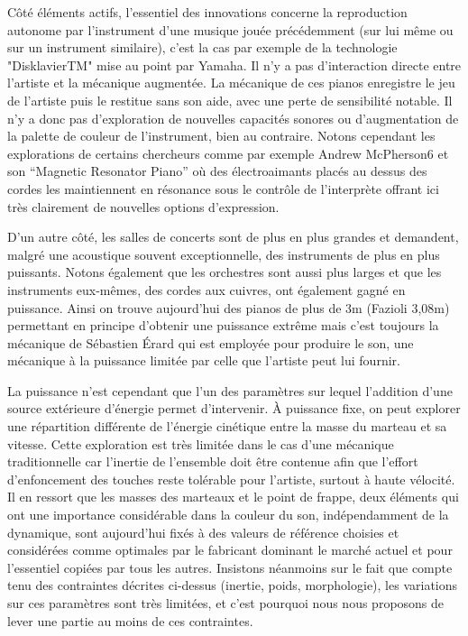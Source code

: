 \documentclass[french,a4paper,12pt]{report}
\begin{document}
Côté éléments actifs, l’essentiel des innovations concerne la reproduction autonome par l’instrument d’une musique jouée précédemment (sur lui même ou sur un instrument similaire), c’est la cas par exemple de la technologie "DisklavierTM" mise au point par Yamaha. Il n’y a pas d’interaction directe entre l’artiste et la mécanique augmentée. La mécanique de ces pianos enregistre le jeu de l’artiste puis le restitue sans son aide, avec une
perte de sensibilité notable. Il n’y a donc pas d’exploration de nouvelles capacités sonores ou d’augmentation de la palette de couleur de l’instrument, bien au contraire. Notons cependant les explorations de certains chercheurs comme par exemple Andrew McPherson6 et son “Magnetic Resonator Piano” où des électroaimants placés au dessus des cordes les maintiennent en résonance sous le contrôle de l’interprète offrant ici très clairement de nouvelles options d’expression.

D’un autre côté, les salles de concerts sont de plus en plus grandes et demandent, malgré une acoustique souvent exceptionnelle, des instruments de plus en plus puissants. Notons également que les orchestres sont aussi plus larges et que les instruments eux-mêmes, des cordes aux cuivres, ont également gagné en puissance. Ainsi on trouve aujourd’hui des pianos de plus de 3m (Fazioli 3,08m) permettant en principe d’obtenir une puissance extrême mais
c’est toujours la mécanique de Sébastien Érard qui est employée pour produire le son, une mécanique à la puissance limitée par celle que l’artiste peut lui fournir.

La puissance n’est cependant que l’un des paramètres sur lequel l’addition d’une source extérieure d’énergie permet d’intervenir. À puissance fixe, on peut explorer une répartition différente de l’énergie cinétique entre la masse du marteau et sa vitesse. Cette exploration est très limitée dans le cas d’une mécanique traditionnelle car l’inertie de l’ensemble doit être contenue afin que l’effort d’enfoncement des touches reste tolérable pour l’artiste, surtout à haute vélocité. Il en ressort que les masses des marteaux et le point de frappe, deux éléments qui ont une importance considérable dans la couleur du son, indépendamment de la dynamique, sont aujourd’hui fixés à des valeurs de référence choisies et considérées comme optimales par le fabricant dominant le marché actuel et pour l’essentiel copiées par tous les autres. Insistons néanmoins sur le fait que compte tenu des contraintes décrites ci-dessus
(inertie, poids, morphologie), les variations sur ces paramètres sont très limitées, et c’est pourquoi nous nous proposons de lever une partie au moins de ces contraintes.
\end{document}
